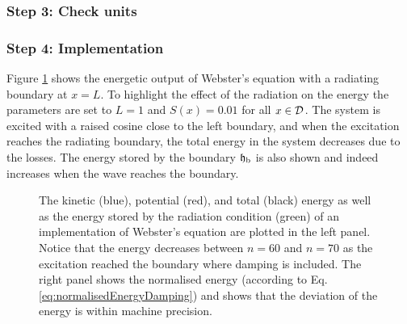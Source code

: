 {\subsubsection{Step 3: Check units}
\SWcomment[It seems like in order for the units to make sense, one must write Eq. \eqref{eq:webstersPDE} as
\begin{equation}
    \frac{S\rho}{c^2} \ptt\Psi = \frac{B}{c^2}\px(S(\px\Psi)),
\end{equation}
where $B$ is the bulk modulus of air (in N/m$^2$)]
\subsubsection{Step 4: Implementation}
Figure \ref{fig:energyWebsters} shows the energetic output of Webster's equation with a radiating boundary at $x=L$. To highlight the effect of the radiation on the energy the parameters are set to $L = 1$ and $S(x) = 0.01$ for all $x\in \mathcal{D}$.  The system is excited with a raised cosine close to the left boundary, and when the excitation reaches the radiating boundary, the total energy in the system decreases due to the losses. The energy stored by the boundary $\mathfrak{h}_\text{b}$ is also shown and indeed increases when the wave reaches the boundary.
\begin{figure}[h]
    \centering
      \caption{The kinetic (blue), potential (red), and total (black) energy as well as the energy stored by the radiation condition (green) of an implementation of Webster's equation are plotted in the left panel. Notice that the energy decreases between $n=60$ and $n=70$ as the excitation reached the boundary where damping is included. The right panel shows the normalised energy (according to Eq. \eqref{eq:normalisedEnergyDamping}) and shows that the deviation of the energy is within machine precision. \label{fig:energyWebsters}}
\end{figure}

}
